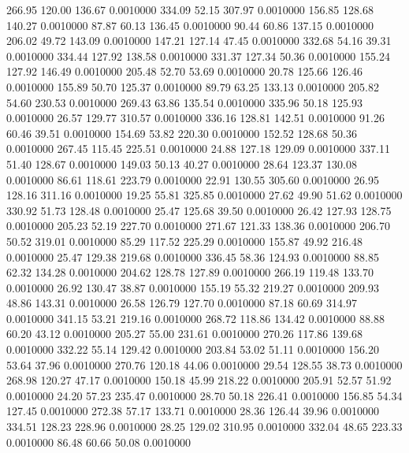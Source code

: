  266.95  120.00  136.67   0.0010000
 334.09   52.15  307.97   0.0010000
 156.85  128.68  140.27   0.0010000
  87.87   60.13  136.45   0.0010000
  90.44   60.86  137.15   0.0010000
 206.02   49.72  143.09   0.0010000
 147.21  127.14   47.45   0.0010000
 332.68   54.16   39.31   0.0010000
 334.44  127.92  138.58   0.0010000
 331.37  127.34   50.36   0.0010000
 155.24  127.92  146.49   0.0010000
 205.48   52.70   53.69   0.0010000
  20.78  125.66  126.46   0.0010000
 155.89   50.70  125.37   0.0010000
  89.79   63.25  133.13   0.0010000
 205.82   54.60  230.53   0.0010000
 269.43   63.86  135.54   0.0010000
 335.96   50.18  125.93   0.0010000
  26.57  129.77  310.57   0.0010000
 336.16  128.81  142.51   0.0010000
  91.26   60.46   39.51   0.0010000
 154.69   53.82  220.30   0.0010000
 152.52  128.68   50.36   0.0010000
 267.45  115.45  225.51   0.0010000
  24.88  127.18  129.09   0.0010000
 337.11   51.40  128.67   0.0010000
 149.03   50.13   40.27   0.0010000
  28.64  123.37  130.08   0.0010000
  86.61  118.61  223.79   0.0010000
  22.91  130.55  305.60   0.0010000
  26.95  128.16  311.16   0.0010000
  19.25   55.81  325.85   0.0010000
  27.62   49.90   51.62   0.0010000
 330.92   51.73  128.48   0.0010000
  25.47  125.68   39.50   0.0010000
  26.42  127.93  128.75   0.0010000
 205.23   52.19  227.70   0.0010000
 271.67  121.33  138.36   0.0010000
 206.70   50.52  319.01   0.0010000
  85.29  117.52  225.29   0.0010000
 155.87   49.92  216.48   0.0010000
  25.47  129.38  219.68   0.0010000
 336.45   58.36  124.93   0.0010000
  88.85   62.32  134.28   0.0010000
 204.62  128.78  127.89   0.0010000
 266.19  119.48  133.70   0.0010000
  26.92  130.47   38.87   0.0010000
 155.19   55.32  219.27   0.0010000
 209.93   48.86  143.31   0.0010000
  26.58  126.79  127.70   0.0010000
  87.18   60.69  314.97   0.0010000
 341.15   53.21  219.16   0.0010000
 268.72  118.86  134.42   0.0010000
  88.88   60.20   43.12   0.0010000
 205.27   55.00  231.61   0.0010000
 270.26  117.86  139.68   0.0010000
 332.22   55.14  129.42   0.0010000
 203.84   53.02   51.11   0.0010000
 156.20   53.64   37.96   0.0010000
 270.76  120.18   44.06   0.0010000
  29.54  128.55   38.73   0.0010000
 268.98  120.27   47.17   0.0010000
 150.18   45.99  218.22   0.0010000
 205.91   52.57   51.92   0.0010000
  24.20   57.23  235.47   0.0010000
  28.70   50.18  226.41   0.0010000
 156.85   54.34  127.45   0.0010000
 272.38   57.17  133.71   0.0010000
  28.36  126.44   39.96   0.0010000
 334.51  128.23  228.96   0.0010000
  28.25  129.02  310.95   0.0010000
 332.04   48.65  223.33   0.0010000
  86.48   60.66   50.08   0.0010000
